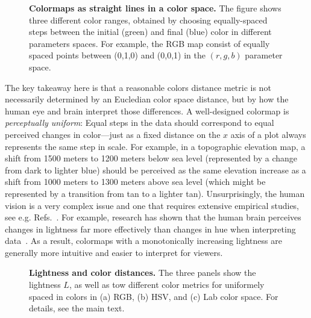 \begin{figure}
\captionsetup{format = sidebyside, indention = 0cm} 
\begin{minipage}[t]{0.4\textwidth}
	\vspace{-5pt}
	\caption{\textbf{Colormaps as straight lines in a color space.} The figure shows three different color ranges, obtained by choosing equally-spaced steps between the initial (green) and final (blue) color in different parameters spaces. For example, the RGB map consist of equally spaced points between (0,1,0) and (0,0,1) in the $(r,g,b)$ parameter space.}
	\label{fig:colorspaces}
\end{minipage}\hfill 
\begin{minipage}[t]{0.55\textwidth}
	\centering 
	\vspace{0pt}
	
\end{minipage}
\end{figure} 

The key takeaway here is that a reasonable colors distance metric is not necessarily determined by an Eucledian color space distance, but by how the human eye and brain interpret those differences. A well-designed colormap is \emph{perceptually uniform}: Equal steps in the data should correspond to equal perceived changes in color---just as a fixed distance on the $x$ axis of a plot always represents the same step in scale. For example, in a topographic elevation map, a shift from 1500 meters to 1200 meters below sea level (represented by a change from dark to lighter blue) should be perceived as the same elevation increase as a shift from 1000 meters to 1300 meters above sea level (which might be represented by a transition from tan to a lighter tan).
Unsurprisingly, the human vision is a very complex issue and one that requires extensive empirical studies, see e.g. Refs.~\cite{rogowitz1996,mullen1985,crameri2020}. For example, research has shown that the human brain perceives changes in lightness far more effectively than changes in hue when interpreting data~\cite{rogowitz1996}. As a result, colormaps with a monotonically increasing lightness are generally more intuitive and easier to interpret for viewers.

\begin{figure}
	\centering
	
	\caption{\textbf{Lightness and color distances.} The three panels show the lightness $L$, as well as tow different color metrics for uniformely spaced in colors in (a) RGB, (b) HSV, and (c) Lab color space. For details, see the main text.}
	\label{fig:colordiffs}
\end{figure}


